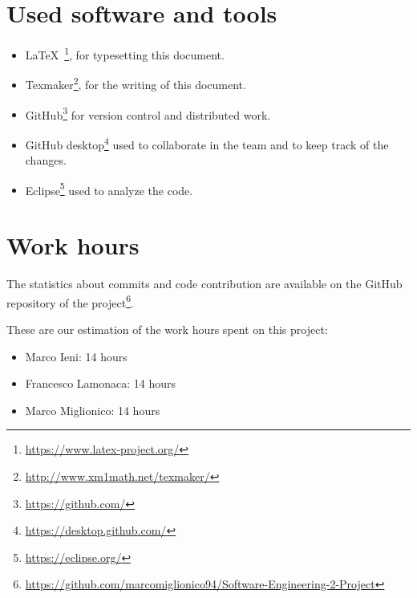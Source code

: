 \section{Used software and tools}
\begin{itemize}
    \item \LaTeX\ \footnote{\url{https://www.latex-project.org/}}, for typesetting this document.
    \item Texmaker\footnote{\url{http://www.xm1math.net/texmaker/}}, for the writing of this document.
    \item GitHub\footnote{\url{https://github.com/}} for version control and distributed work.
    \item GitHub desktop\footnote{\url{https://desktop.github.com/}} used to collaborate in the team and to keep track of the changes.
    \item Eclipse\footnote{\url{https://eclipse.org/}} used to analyze the code. 
\end{itemize}

\section{Work hours}
The statistics about commits and code contribution are available on the GitHub repository of the project\footnote{\url{https://github.com/marcomiglionico94/Software-Engineering-2-Project}}.

These are our estimation of the work hours spent on this project:
\begin{itemize}
    \item Marco Ieni: 14 hours
    \item Francesco Lamonaca: 14 hours
    \item Marco Miglionico: 14 hours
\end{itemize}
